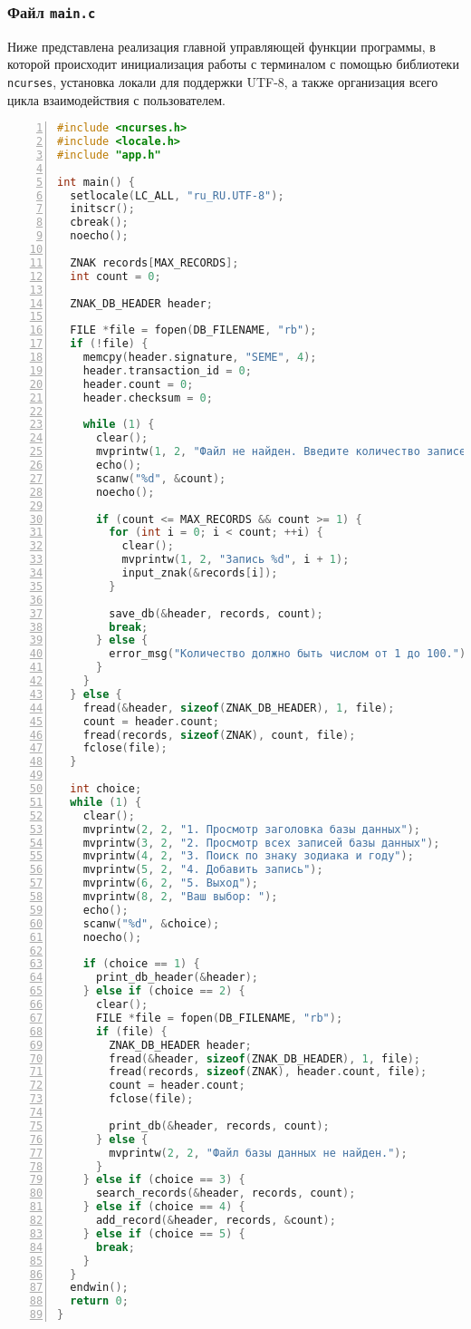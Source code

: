 \subsubsection*{Файл \texttt{main.c}}

Ниже представлена реализация главной управляющей функции программы, в которой происходит инициализация работы с терминалом с помощью библиотеки \texttt{ncurses}, установка локали для поддержки UTF-8, а также организация всего цикла взаимодействия с пользователем.

\begin{lstlisting}[language=C, numbers=left, caption=main.c]
#include <ncurses.h>
#include <locale.h>
#include "app.h"

int main() {
  setlocale(LC_ALL, "ru_RU.UTF-8");
  initscr();
  cbreak();
  noecho();

  ZNAK records[MAX_RECORDS];
  int count = 0;

  ZNAK_DB_HEADER header;

  FILE *file = fopen(DB_FILENAME, "rb");
  if (!file) {
    memcpy(header.signature, "SEME", 4);
    header.transaction_id = 0;
    header.count = 0;
    header.checksum = 0;

    while (1) {
      clear();
      mvprintw(1, 2, "Файл не найден. Введите количество записей: ");
      echo();
      scanw("%d", &count);
      noecho();

      if (count <= MAX_RECORDS && count >= 1) {
        for (int i = 0; i < count; ++i) {
          clear();
          mvprintw(1, 2, "Запись %d", i + 1);
          input_znak(&records[i]);
        }

        save_db(&header, records, count);
        break;
      } else {
        error_msg("Количество должно быть числом от 1 до 100.");
      }
    }
  } else {
    fread(&header, sizeof(ZNAK_DB_HEADER), 1, file);
    count = header.count;
    fread(records, sizeof(ZNAK), count, file);
    fclose(file);
  }

  int choice;
  while (1) {
    clear();
    mvprintw(2, 2, "1. Просмотр заголовка базы данных");
    mvprintw(3, 2, "2. Просмотр всех записей базы данных");
    mvprintw(4, 2, "3. Поиск по знаку зодиака и году");
    mvprintw(5, 2, "4. Добавить запись");
    mvprintw(6, 2, "5. Выход");
    mvprintw(8, 2, "Ваш выбор: ");
    echo();
    scanw("%d", &choice);
    noecho();

    if (choice == 1) {
      print_db_header(&header);
    } else if (choice == 2) {
      clear();
      FILE *file = fopen(DB_FILENAME, "rb");
      if (file) {
        ZNAK_DB_HEADER header;
        fread(&header, sizeof(ZNAK_DB_HEADER), 1, file);
        fread(records, sizeof(ZNAK), header.count, file);
        count = header.count;
        fclose(file);

        print_db(&header, records, count);
      } else {
        mvprintw(2, 2, "Файл базы данных не найден.");
      }
    } else if (choice == 3) {
      search_records(&header, records, count);
    } else if (choice == 4) {
      add_record(&header, records, &count);
    } else if (choice == 5) {
      break;
    }
  }
  endwin();
  return 0;
}
\end{lstlisting}

